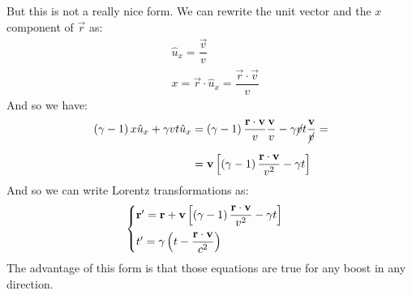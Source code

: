 But this is not a really nice form. We can rewrite the unit vector and the $x$ component of $\vec{r}$ as:
\begin{equation}
  \begin{split}
    &\hat{u}_{x} = \dfrac{\vec{v}}{v} \\[8pt]
    &x = \vec{r} \cdot \hat{u}_{x} = \dfrac{\vec{r} \cdot \vec{v}}{v}
  \end{split}
\end{equation}
And so we have:
\begin{equation}
  \begin{split}
    \left(\gamma -1\right)x\hat{u}_{x} + \gamma vt\hat{u}_{x} &= \left(\gamma -1\right)\dfrac{\vb{r} \cdot \vb{v}}{v} \dfrac{\vb{v}}{v} - \gamma \cancel{v}t \dfrac{\vb{v}}{\cancel{v}} = \\[8pt]
    & = \vb{v} \left[\left(\gamma -1\right)\dfrac{\vb{r} \cdot \vb{v}}{v^2} - \gamma t\right]
  \end{split}
\end{equation}
And so we can write Lorentz transformations as:
\begin{equation}
  \begin{cases}
    \vb{r}' = \vb{r} + \vb{v} \left[\left(\gamma - 1\right) \dfrac{\vb{r} \cdot \vb{v}}{v^2} - \gamma t\right] \\[8pt]
    t' = \gamma \left(t - \dfrac{\vb{r} \cdot \vb{v}}{c^2}\right)
  \end{cases}
\end{equation}
The advantage of this form is that those equations are true for any boost in any direction.
